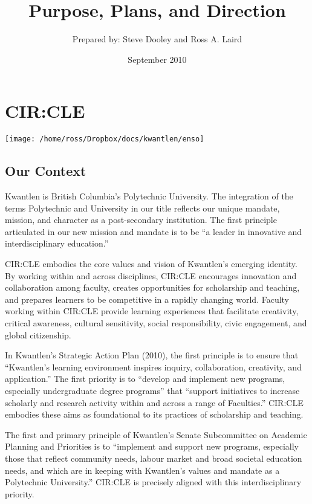 \documentclass[12pt,DIV11,letterpaper,oneside,abstractoff,headsepline]{scrreprt}
\author{Prepared by: Steve Dooley and Ross A. Laird}
\date{September 2010}
\title{\huge\sffamily Purpose, Plans, and Direction}
\begin{document}
\maketitle
\tableofcontents
\chapter[CIR:CLE]{CIR:CLE}
\texttt{[image: /home/ross/Dropbox/docs/kwantlen/enso]}\\[2em]
\section{Our Context}
\label{sec-1}

Kwantlen is British Columbia's Polytechnic University. The integration of the terms Polytechnic and University in our title reflects our unique mandate, mission, and character as a post-secondary institution. The first principle articulated in our new mission and mandate is to be ``a leader in innovative and interdisciplinary education.''

\textsc{CIR:CLE} embodies the core values and vision of Kwantlen’s emerging identity. By working within and across disciplines, CIR:CLE encourages innovation and collaboration among faculty, creates opportunities for scholarship and teaching, and prepares learners to be competitive in a rapidly changing world. Faculty working within CIR:CLE provide learning experiences that facilitate creativity, critical awareness, cultural sensitivity, social responsibility, civic engagement, and global citizenship.

In Kwantlen's Strategic Action Plan (2010), the first principle is to ensure that ``Kwantlen's learning environment inspires inquiry, collaboration, creativity, and application.'' The first priority is to ``develop and implement new programs, especially undergraduate degree programs'' that ``support initiatives to increase scholarly and research activity within and across a range of Faculties.'' CIR:CLE embodies these aims as foundational to its practices of scholarship and teaching.

The first and primary principle of Kwantlen's Senate Subcommittee on Academic Planning and Priorities is to ``implement and support new programs, especially those that reflect community needs, labour market and broad societal education needs, and which are in keeping with Kwantlen’s values and mandate as a Polytechnic University.'' CIR:CLE is precisely aligned with this interdisciplinary priority. 
\end{document}
